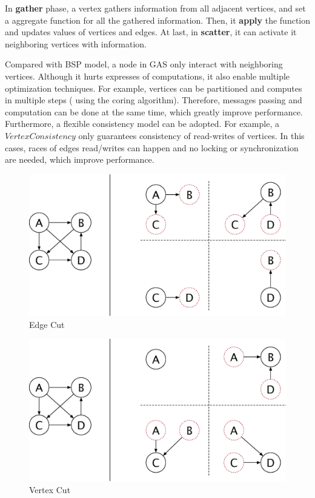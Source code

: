 In \textbf{gather} phase, a vertex gathers information from all adjacent vertices, and
set a aggregate function for all the gathered information. Then, it \textbf{apply}
the function and updates values of vertices and edges. At last, in \textbf{scatter},
it can activate it neighboring vertices with information.

Compared with BSP model, a node in GAS only interact with neighboring
vertices. Although it hurts expresses of computations, it also
enable multiple optimization techniques. For example, vertices can
be partitioned and computes in multiple steps (\eg{} using the coring
algorithm). Therefore,
messages passing and computation can be done at the same time, which
greatly improve performance.
Furthermore, a flexible consistency model can be adopted. For example,
a $Vertex Consistency$ only guarantees consistency of read-writes
of vertices. In this cases, races of edges read/writes can happen
and no locking or synchronization are needed, which improve performance.


\begin{figure}
  \center
  \includegraphics[width=.8\linewidth]{figures/edgecut}
  \caption{Edge Cut}
  \label{edgecut}
\end{figure}

\begin{figure}
  \center
  \includegraphics[width=.8\linewidth]{figures/vertexcut}
  \caption{Vertex Cut}
  \label{vertexcut}
\end{figure}

